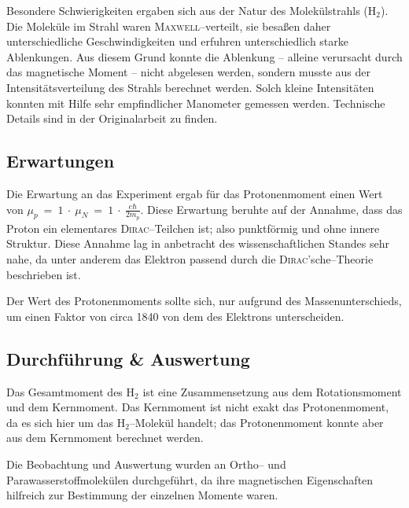 \documentclass[sn-mathphys-num,iicol]{sn-jnl}
\theoremstyle{thmstyleone}
\theoremstyle{thmstyletwo}
\theoremstyle{thmstylethree}
\begin{document}
Besondere Schwierigkeiten ergaben sich aus der Natur des Molekülstrahls ($\text{H}_2$).
Die Moleküle im Strahl waren \textsc{Maxwell}--verteilt, sie besaßen daher unterschiedliche Geschwindigkeiten und erfuhren unterschiedlich starke Ablenkungen.
Aus diesem Grund konnte die Ablenkung -- alleine verursacht durch das magnetische Moment -- nicht abgelesen werden, sondern musste aus der Intensitätsverteilung des Strahls berechnet werden.
Solch kleine Intensitäten konnten mit Hilfe sehr empfindlicher Manometer gemessen werden.
Technische Details sind in der Originalarbeit\cite{FrischStern1933} zu finden.

\subsection{Erwartungen}
Die Erwartung an das Experiment ergab für das Protonenmoment einen Wert von $\mu _p~=~1~\cdot~\mu _N~=~1~\cdot~\tfrac{e\hbar }{2m_p}$.
Diese Erwartung beruhte auf der Annahme, dass das Proton ein elementares \textsc{Dirac}--Teilchen ist; also punktförmig und ohne innere Struktur.
Diese Annahme lag in anbetracht des wissenschaftlichen Standes sehr nahe, da unter anderem das Elektron passend durch die \textsc{Dirac}'sche--Theorie beschrieben ist.

Der Wert des Protonenmoments sollte sich, nur aufgrund des Massenunterschieds, um einen Faktor von circa 1840 von dem des Elektrons unterscheiden.\cite{FrischStern1933}

\subsection{Durchführung \& Auswertung}
Das Gesamtmoment des $\text{H}_2$ ist eine Zusammensetzung aus dem Rotationsmoment und dem Kernmoment.
Das Kernmoment ist nicht exakt das Protonenmoment, da es sich hier um das $\text{H}_2$--Molekül handelt; das Protonenmoment konnte aber aus dem Kernmoment berechnet werden.

Die Beobachtung und Auswertung wurden an Ortho-- und Parawasserstoffmolekülen durchgeführt, da ihre magnetischen Eigenschaften hilfreich zur Bestimmung der einzelnen Momente waren.
\end{document}
